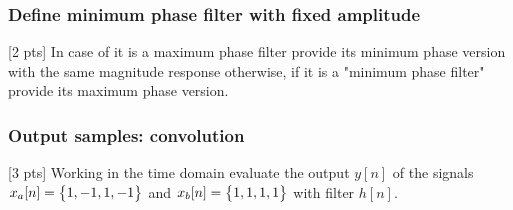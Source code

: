 
    \subsubsection{Define minimum phase filter with fixed amplitude}
    [2 pts] In case of it is a maximum phase filter provide its minimum phase version with the same magnitude response otherwise, if it is a "minimum phase filter" provide its maximum phase version.


    \subsubsection{Output samples: convolution}
    [3 pts] Working in the time domain evaluate the output $y[n]$ of the signals
    $x_a[n]=\begin{Bmatrix} {1,-1,1,-1} \end{Bmatrix}$ and $x_b[n]=\begin{Bmatrix} {1,1,1,1} \end{Bmatrix}$ with filter $h[n]$.

